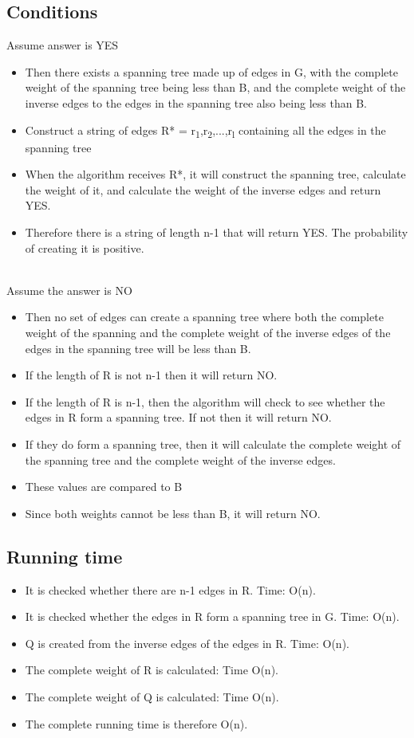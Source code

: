 \subsection{Conditions}
Assume answer is YES
\begin{itemize}
\item Then there exists a spanning tree made up of edges in G, with the complete weight of the spanning tree being less than B, and the complete weight of the inverse edges to the edges in the spanning tree also being less than B.
\item Construct a string of edges R* = r\textsubscript{1},r\textsubscript{2},...,r\textsubscript{l} containing all the edges in the spanning tree
\item When the algorithm receives R*, it will construct the spanning tree, calculate the weight of it, and calculate the weight of the inverse edges and return YES.
\item Therefore there is a string of length n-1 that will return YES. The probability of creating it is positive.\\\\
\end{itemize}
Assume the answer is NO
\begin{itemize}
\item Then no set of edges can create a spanning tree where both the complete weight of the spanning and the complete weight of the inverse edges of the edges in the spanning tree will be less than B.
\item If the length of R is not n-1 then it will return NO.
\item If the length of R is n-1, then the algorithm will check to see whether the edges in R form a spanning tree. If not then it will return NO.
\item If they do form a spanning tree, then it will calculate the complete weight of the spanning tree and the complete weight of the inverse edges.
\item These values are compared to B
\item Since both weights cannot be less than B, it will return NO.\\
\end{itemize}
\subsection{Running time}
\begin{itemize}
\item It is checked whether there are n-1 edges in R. Time: O(n).
\item It is checked whether the edges in R form a spanning tree in G. Time: O(n).
\item Q is created from the inverse edges of the edges in R. Time: O(n).
\item The complete weight of R is calculated: Time O(n).
\item The complete weight of Q is calculated: Time O(n).
\item The complete running time is therefore O(n).
\end{itemize}